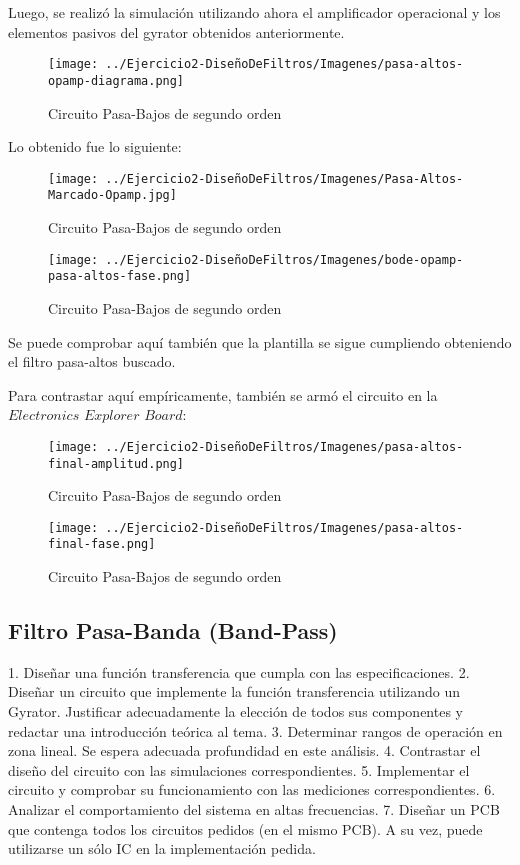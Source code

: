 Luego, se realizó la simulación utilizando ahora el amplificador operacional y los elementos pasivos del gyrator obtenidos anteriormente.

\begin{figure}[H]
    \centering
    \texttt{[image: ../Ejercicio2-DiseñoDeFiltros/Imagenes/pasa-altos-opamp-diagrama.png]}
    \caption{Circuito Pasa-Bajos de segundo orden}
\end{figure}

Lo obtenido fue lo siguiente:

\begin{figure}[H]
    \centering
    \texttt{[image: ../Ejercicio2-DiseñoDeFiltros/Imagenes/Pasa-Altos-Marcado-Opamp.jpg]}
    \caption{Circuito Pasa-Bajos de segundo orden}
\end{figure}

\begin{figure}[H]
    \centering
    \texttt{[image: ../Ejercicio2-DiseñoDeFiltros/Imagenes/bode-opamp-pasa-altos-fase.png]}
    \caption{Circuito Pasa-Bajos de segundo orden}
\end{figure}

Se puede comprobar aquí también que la plantilla se sigue cumpliendo obteniendo el filtro pasa-altos buscado.

Para contrastar aquí empíricamente, también se armó el circuito en la $Electronics$ $Explorer$ $Board$:

\begin{figure}[H]
    \centering
    \texttt{[image: ../Ejercicio2-DiseñoDeFiltros/Imagenes/pasa-altos-final-amplitud.png]}
    \caption{Circuito Pasa-Bajos de segundo orden}
\end{figure}

\begin{figure}[H]
    \centering
    \texttt{[image: ../Ejercicio2-DiseñoDeFiltros/Imagenes/pasa-altos-final-fase.png]}
    \caption{Circuito Pasa-Bajos de segundo orden}
\end{figure}


\subsection{Filtro Pasa-Banda (Band-Pass)}

1. Diseñar una función transferencia que cumpla con las especificaciones.
2. Diseñar un circuito que implemente la función transferencia utilizando un Gyrator. Justificar adecuadamente la elección de todos sus componentes y redactar una introducción teórica al tema.
3. Determinar rangos de operación en zona lineal. Se espera adecuada profundidad en este análisis.
4. Contrastar el diseño del circuito con las simulaciones correspondientes.
5. Implementar el circuito y comprobar su funcionamiento con las mediciones correspondientes.
6. Analizar el comportamiento del sistema en altas frecuencias.
7. Diseñar un PCB que contenga todos los circuitos pedidos (en el mismo PCB). A su vez, puede utilizarse un
sólo IC en la implementación pedida.

